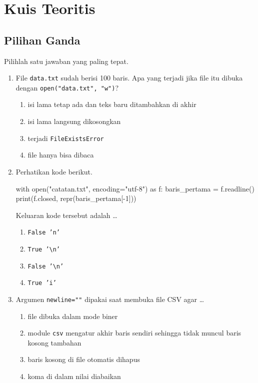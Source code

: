 \section{Kuis Teoritis}

\subsection{Pilihan Ganda}

Pilihlah satu jawaban yang paling tepat.

\begin{enumerate}
  \item File \texttt{data.txt} sudah berisi 100 baris. Apa yang terjadi jika file itu dibuka dengan \texttt{open("data.txt", "w")}?
  \begin{enumerate}[label=\alph*.,itemsep=0pt]
    \item isi lama tetap ada dan teks baru ditambahkan di akhir
    \item isi lama langsung dikosongkan
    \item terjadi \texttt{FileExistsError}
    \item file hanya bisa dibaca
  \end{enumerate}

  \item Perhatikan kode berikut.
\begin{kode}[Soal 2]
with open("catatan.txt", encoding="utf-8") as f:
    baris_pertama = f.readline()
print(f.closed, repr(baris_pertama[-1]))
\end{kode}
  Keluaran kode tersebut adalah \ldots
  \begin{enumerate}[label=\alph*.,itemsep=0pt]
    \item \texttt{False 'n'}
    \item \texttt{True '\textbackslash n'}
    \item \texttt{False '\textbackslash n'}
    \item \texttt{True 'i'}
  \end{enumerate}

  \item Argumen \texttt{newline=""} dipakai saat membuka file CSV agar \ldots
  \begin{enumerate}[label=\alph*.,itemsep=0pt]
    \item file dibuka dalam mode biner
    \item module \texttt{csv} mengatur akhir baris sendiri sehingga tidak muncul baris kosong tambahan
    \item baris kosong di file otomatis dihapus
    \item koma di dalam nilai diabaikan
  \end{enumerate}


\end{enumerate}
